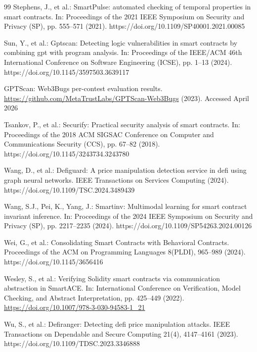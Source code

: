 \documentclass[pdflatex,sn-basic]{sn-jnl}%
\theoremstyle{thmstyleone}%
\theoremstyle{thmstyletwo}%
\theoremstyle{thmstylethree}%
\begin{document}
\begin{thebibliography}{99}
Stephens, J., et al.: SmartPulse: automated checking of temporal properties in smart contracts. In: Proceedings of the 2021 IEEE Symposium on Security and Privacy (SP), pp. 555--571 (2021). https://doi.org/10.1109/SP40001.2021.00085

Sun, Y., et al.: Gptscan: Detecting logic vulnerabilities in smart contracts by combining gpt with program analysis. In: Proceedings of the IEEE/ACM 46th International Conference on Software Engineering (ICSE), pp. 1--13 (2024). https://doi.org/10.1145/3597503.3639117

GPTScan: Web3Bugs per-contest evaluation results. \url{https://github.com/MetaTrustLabs/GPTScan-Web3Bugs} (2023). Accessed April 2026

Tsankov, P., et al.: Securify: Practical security analysis of smart contracts. In: Proceedings of the 2018 ACM SIGSAC Conference on Computer and Communications Security (CCS), pp. 67--82 (2018). https://doi.org/10.1145/3243734.3243780

Wang, D., et al.: Defiguard: A price manipulation detection service in defi using graph neural networks. IEEE Transactions on Services Computing (2024). https://doi.org/10.1109/TSC.2024.3489439

Wang, S.J., Pei, K., Yang, J.: Smartinv: Multimodal learning for smart contract invariant inference. In: Proceedings of the 2024 IEEE Symposium on Security and Privacy (SP), pp. 2217--2235 (2024). https://doi.org/10.1109/SP54263.2024.00126

Wei, G., et al.: Consolidating Smart Contracts with Behavioral Contracts. Proceedings of the ACM on Programming Languages 8(PLDI), 965--989 (2024). https://doi.org/10.1145/3656416

Wesley, S., et al.: Verifying Solidity smart contracts via communication abstraction in SmartACE. In: International Conference on Verification, Model Checking, and Abstract Interpretation, pp. 425--449 (2022). \url{https://doi.org/10.1007/978-3-030-94583-1_21}

Wu, S., et al.: Defiranger: Detecting defi price manipulation attacks. IEEE Transactions on Dependable and Secure Computing 21(4), 4147--4161 (2023). https://doi.org/10.1109/TDSC.2023.3346888


\end{thebibliography}
\end{document}

